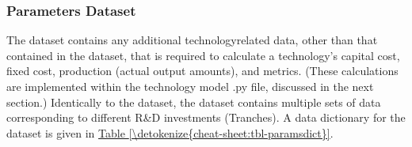 \documentclass[letterpaper,10pt,english]{sphinxmanual}
\begin{document}
\subsubsection{Parameters Dataset}
\label{\detokenize{cheat-sheet:parameters-dataset}}
\sphinxAtStartPar
The  dataset contains any additional technology\sphinxhyphen{}related data, other than that contained in the  dataset, that is required to calculate a technology’s capital cost, fixed cost, production (actual output amounts), and metrics. (These calculations are implemented within the technology model .py file, discussed in the next section.) Identically to the  dataset, the  dataset contains multiple sets of data corresponding to different R\&D investments (Tranches). A data dictionary for the  dataset is given in \hyperref[\detokenize{cheat-sheet:tbl-paramsdict}]{Table \ref{\detokenize{cheat-sheet:tbl-paramsdict}}}.
\end{document}
